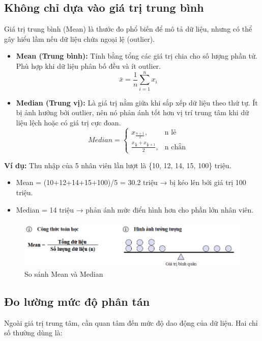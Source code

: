 \documentclass[11pt]{article}
\begin{document}
\subsection{Không chỉ dựa vào giá trị trung bình}
Giá trị trung bình (Mean) là thước đo phổ biến để mô tả dữ liệu, nhưng có thể gây hiểu lầm nếu dữ liệu chứa ngoại lệ (outlier).
\begin{itemize}
    \item \textbf{Mean (Trung bình):} Tính bằng tổng các giá trị chia cho số lượng phần tử. Phù hợp khi dữ liệu phân bố đều và ít outlier.
	\[
        \bar{x} = \frac{1}{n} \sum_{i=1}^{n} x_i
    \]

    \item \textbf{Median (Trung vị):} Là giá trị nằm giữa khi sắp xếp dữ liệu theo thứ tự. Ít bị ảnh hưởng bởi outlier, nên nó phản ánh tốt hơn vị trí trung tâm khi dữ liệu lệch hoặc có giá trị cực đoan.
    \[
        Median =
        \begin{cases}
            x_{\frac{n+1}{2}}, & \text{n lẻ} \\[6pt]
            \frac{x_{\frac{n}{2}} + x_{\frac{n}{2}+1}}{2}, & \text{n chẵn}
        \end{cases}
    \]
\end{itemize}

\textbf{Ví dụ:} Thu nhập của 5 nhân viên lần lượt là \{10, 12, 14, 15, 100\} triệu.
\begin{itemize}
    \item Mean = (10+12+14+15+100)/5 = 30.2 triệu → bị kéo lên bởi giá trị 100 triệu.
    \item Median = 14 triệu → phản ánh mức điển hình hơn cho phần lớn nhân viên.
\end{itemize}

\begin{figure}[H]
    \centering
    \includegraphics[width=1\linewidth]{images/mean_vs_median.png}
    \caption{So sánh Mean và Median}
    \label{fig:mean vs median}
\end{figure}


\subsection{Đo lường mức độ phân tán}
Ngoài giá trị trung tâm, cần quan tâm đến mức độ dao động của dữ liệu. Hai chỉ số thường dùng là:
\end{document}
